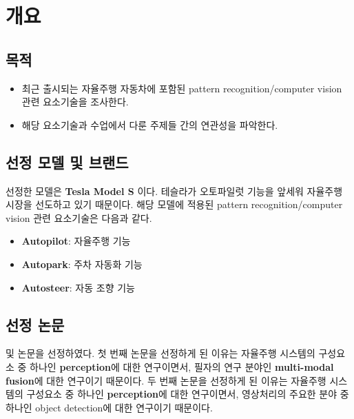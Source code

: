 \section{개요}{\label{sec:intro}}

\subsection{목적}
\begin{itemize}\tightlist
    \item 최근 출시되는 자율주행 자동차에 포함된 pattern recognition/computer vision 관련 요소기술을 조사한다.
    \item 해당 요소기술과 수업에서 다룬 주제들 간의 연관성을 파악한다.
\end{itemize}

\subsection{선정 모델 및 브랜드}
선정한 모델은 \textbf{Tesla Model S} 이다.
테슬라가 오토파일럿 기능을 앞세워 자율주행 시장을 선도하고 있기 때문이다.
해당 모델에 적용된 pattern recognition/computer vision 관련 요소기술은 다음과 같다.
\begin{itemize}\tightlist
    \item \textbf{Autopilot}: 자율주행 기능
    \item \textbf{Autopark}: 주차 자동화 기능
    \item \textbf{Autosteer}: 자동 조향 기능
\end{itemize}

\subsection{선정 논문}
\cite[Multi-modal fusion transformer for end-to-end autonomous driving]{Transfuser} 및 
\cite[YOLOv7: Trainable bag-of-freebies sets new state-of-the-art for real-time object detectors]{YOLOv7}
논문을 선정하였다.
첫 번째 논문을 선정하게 된 이유는 자율주행 시스템의 구성요소 중 하나인 \textbf{perception}에 대한 연구이면서,
필자의 연구 분야인 \textbf{multi-modal fusion}에 대한 연구이기 때문이다.
두 번째 논문을 선정하게 된 이유는 자율주행 시스템의 구성요소 중 하나인 \textbf{perception}에 대한 연구이면서,
영상처리의 주요한 분야 중 하나인 object detection에 대한 연구이기 때문이다.

